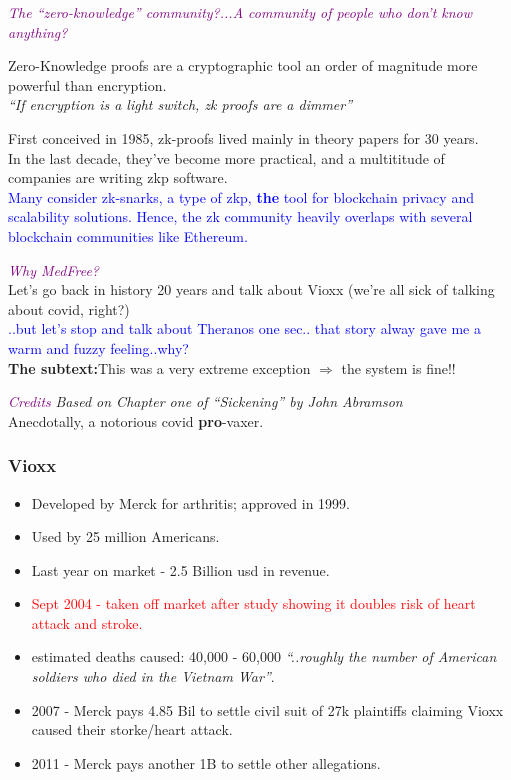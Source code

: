 \documentclass[shadesubsections,compress,14pt,mathserif]{beamer}
\newcommand{\nl}{\\ \pause \vspace{0.2in}}
\newcommand{\stitle}[1]{{\large{\textcolor{purple}{\emph{#1}}}}}
\begin{document}
\begin{frame}
\large{\textcolor{purple}{\emph{The ``zero-knowledge'' community?...A community of people who don't know anything?}}}\nl

Zero-Knowledge proofs are a cryptographic tool an order of magnitude more powerful than encryption.\\
\vspace{0.2in}
\emph{``If encryption is a light switch, zk proofs are a dimmer''}\nl
\end{frame}
\begin{frame}
 First conceived in 1985, zk-proofs lived mainly in theory papers for 30 years.\nl
 In the last decade, they've become more practical, and a multititude of companies are writing zkp software.\nl
 \textcolor{blue}{Many consider zk-snarks, a type of zkp, \textbf{the} tool for blockchain privacy and scalability solutions. Hence, the zk community heavily overlaps with several blockchain communities like Ethereum.}
\end{frame}
\begin{frame}
\large{\textcolor{purple}{\emph{Why MedFree?}}}\nl
 Let's go back in history 20 years and talk about Vioxx (we're all sick of talking about covid, right?) \nl
 \textcolor{blue}{..but let's stop and talk about Theranos one sec..
 that story alway gave me a warm and fuzzy feeling..why?\nl}
 \textbf{The subtext:}This was a very extreme exception $\Rightarrow$ the system is fine!!
\end{frame}
\begin{frame}
 \stitle{Credits}
 \emph{Based on Chapter one of ``Sickening'' by John Abramson}\nl
Anecdotally, a notorious covid \textbf{pro}-vaxer.
\end{frame}
\begin{frame}
 \frametitle{Vioxx}
 \begin{itemize}
  \item Developed by Merck for arthritis; approved in 1999.
  \item Used by 25 million Americans.
  \item Last year on market - 2.5 Billion usd in revenue.\pause
  
  \item \textcolor{red}{Sept 2004 - taken off market after study showing it doubles risk of heart attack and stroke.}
  \item estimated deaths caused: 40,000 - 60,000  \emph{``..roughly the number of American soldiers who died in the Vietnam War''}.\pause
\item 2007 - Merck pays 4.85 Bil to settle civil suit of 27k plaintiffs claiming Vioxx caused their storke/heart attack.
\item 2011 - Merck pays another 1B to settle other allegations.
 \end{itemize}

\end{frame}
\end{document}
